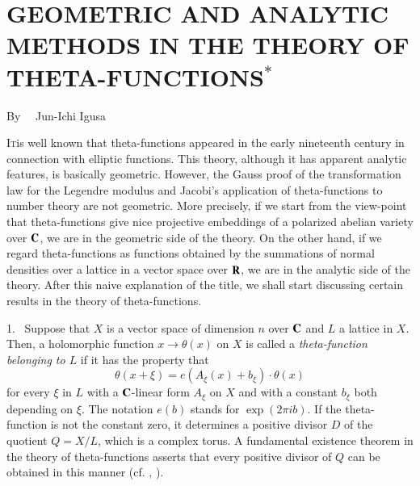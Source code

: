 \chapter[\textsc{J-I. Igusa~:} Geometric and Analytic Methods in the Theory of Theta-Functions]{GEOMETRIC AND ANALYTIC METHODS IN THE THEORY OF THETA-FUNCTIONS$^{*}$}\label{art12}

\begin{center}
By~~ Jun-Ichi Igusa
\end{center}


\setcounter{pageoriginal}{240}
\textsc{It}\pageoriginale is well known that theta-functions appeared in the early nineteenth century in connection with elliptic functions. This theory, although it has apparent analytic features, is basically geometric. However, the Gauss proof of the transformation law for the Legendre modulus and Jacobi's application of theta-functions to number theory are not geometric. More precisely, if we start from the view-point that theta-functions give nice projective embeddings of a polarized abelian variety over $\mathbf{C}$, we are in the geometric side of the theory. On the other hand, if we regard theta-functions as functions obtained by the summations of normal densities over a lattice in a vector space over $\mathbf{R}$, we are in the analytic side of the theory. After this naive explanation of the title, we shall start discussing certain results in the theory of theta-functions.

1.~ Suppose that $X$ is a vector space of dimension $n$ over $\mathbf{C}$ and $L$ a lattice in $X$. Then, a holomorphic function $x\to \theta(x)$ on $X$ is called a {\em theta-function belonging to $L$} if it has the property that
$$
\theta(x+\xi)=e(A_{\xi}(x)+b_{\xi})\cdot \theta(x)
$$
for every $\xi$ in $L$ with a $\mathbf{C}$-linear form $A_{\xi}$ on $X$ and with a constant $b_{\xi}$ both depending on $\xi$. The notation $e(b)$ stands for $\exp(2\pi ib)$. If the theta-function is not the constant zero, it determines a positive divisor $D$ of the quotient $Q=X/L$, which is a complex torus. A fundamental existence theorem in the theory of theta-functions asserts that every positive divisor of $Q$ can be obtained in this manner (cf. \cite{art12-key23}, \cite{art12-key24}).

